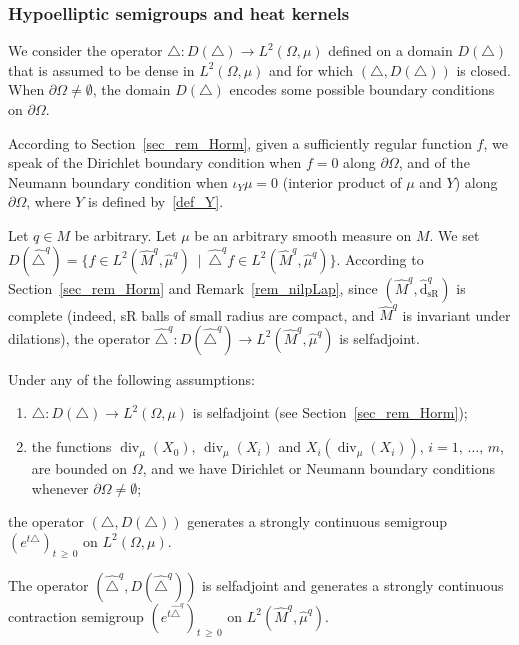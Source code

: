 \documentclass[AHL,Unicode,published]{cedram}
\DeclareMathOperator{\divl}{div}
\newcommand{\hatdsR}{\widehat{\mathrm{d}}_{\mathrm{sR}}}
\renewcommand{\geq}{\geqslant}
\newcommand*{\Alphenumi}{\renewcommand*{\theenumi}{\bf{\Alph{enumi}}}}
\begin{document}
\subsubsection{Hypoelliptic semigroups and heat kernels}\label{sec_kernel}
We consider the operator $\triangle:D(\triangle)\rightarrow L^2(\Omega,\mu)$ defined on a domain $D(\triangle)$ that is assumed to be dense in $L^2(\Omega,\mu)$ and for which $(\triangle,D(\triangle))$ is closed. When $\partial\Omega\neq\emptyset$, the domain $D(\triangle)$ encodes some possible boundary conditions on $\partial\Omega$.

According to Section~\ref{sec_rem_Horm}, given a sufficiently regular function $f$, we speak of the Dirichlet boundary condition when $f=0$ along $\partial\Omega$, and of the Neumann boundary condition when $\iota_Y\mu=0$ (interior product of $\mu$ and $Y$) along $\partial\Omega$, where $Y$ is defined by~\eqref{def_Y}.


Let $q\in M$ be arbitrary. Let $\mu$ be an arbitrary smooth measure on $M$. We set $D(\widehat{\triangle}^{q}) = \{ f\in L^2(\widehat M^{q},\widehat\mu^{q})\ \mid\ \widehat{\triangle}^{q} f\in L^2(\widehat M^{q},\widehat\mu^{q}) \}$. According to Section~\ref{sec_rem_Horm} and Remark~\ref{rem_nilpLap}, since $(\widehat M^{q},\hatdsR^{q})$ is complete (indeed, sR balls of small radius are compact, and $\widehat M^{q}$ is invariant under dilations), the operator $\widehat{\triangle}^{q}:D(\widehat{\triangle}^{q})\rightarrow L^2(\widehat M^{q},\widehat\mu^{q})$ is selfadjoint.

\begin{lemm}\label{lem_semigroup}
Under any of the following assumptions:
\begin{enumerate}\Alphenumi
\item\label{caseA}
$\triangle:D(\triangle)\rightarrow L^2(\Omega,\mu)$ is selfadjoint (see Section~\ref{sec_rem_Horm});
\item\label{caseB}
the functions $\divl_\mu(X_0)$, $\divl_\mu(X_i)$ and $X_i(\divl_\mu(X_i))$, $i=1,\,\ldots,\,m$, are boun\-ded on $\Omega$, and we have Dirichlet or Neumann boundary conditions whenever $\partial\Omega\neq\emptyset$;
\end{enumerate}
the operator $(\triangle,D(\triangle))$ generates a strongly continuous semigroup $(e^{t\triangle})_{t\,\geq\,0}$ on $L^2(\Omega,\mu)$.

The operator $(\widehat{\triangle}^{q},D(\widehat{\triangle}^{q}))$ is selfadjoint and generates a strongly continuous contraction semigroup $(e^{t\widehat{\triangle}^{q}})_{t\,\geq\,0}$ on $L^2(\widehat M^{q},\widehat\mu^{q})$.
\end{lemm}
\end{document}
